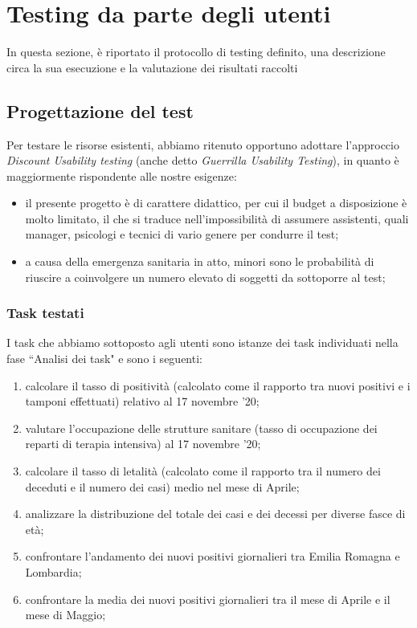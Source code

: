 \section{Testing da parte degli utenti}
In questa sezione, è riportato il protocollo di testing definito, una descrizione circa la sua esecuzione e la valutazione dei risultati raccolti
\subsection{Progettazione del test}
\label{subsubsection:progettazione-del-test}
Per testare le risorse esistenti, abbiamo ritenuto opportuno adottare l'approccio \textit{Discount Usability testing} (anche detto \textit{Guerrilla Usability Testing}), in quanto è maggiormente rispondente alle nostre esigenze: 
\begin{itemize}
    \item il presente progetto è di carattere didattico, per cui il budget a disposizione è molto limitato, il che si traduce nell'impossibilità di assumere assistenti, quali manager, psicologi e tecnici di vario genere per condurre il test;
    \item a causa della emergenza sanitaria in atto, minori sono le probabilità di riuscire a coinvolgere un numero elevato di soggetti da sottoporre al test;
\end{itemize}

\subsubsection{Task testati}
I task che abbiamo sottoposto agli utenti sono istanze dei task individuati nella fase ``Analisi dei task" e sono i seguenti:
\begin{enumerate}
    \item calcolare il tasso di positività (calcolato come il rapporto tra nuovi positivi e i tamponi effettuati) relativo al 17 novembre '20;    
    \item valutare l'occupazione delle strutture sanitare (tasso di occupazione dei reparti di terapia intensiva) al 17 novembre '20;
    \item calcolare il tasso di letalità (calcolato come il rapporto tra il numero dei deceduti e il numero dei casi) medio nel mese di Aprile;
    \item analizzare la distribuzione del totale dei casi e dei decessi per diverse fasce di età;
    \item confrontare l'andamento dei nuovi positivi giornalieri tra Emilia Romagna e Lombardia;
    \item confrontare la media dei nuovi positivi giornalieri tra il mese di Aprile e il mese di Maggio;
\end{enumerate}

